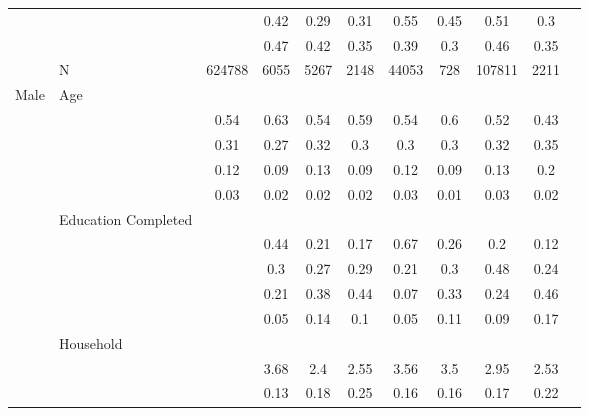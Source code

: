\documentclass[
]{article}
\begin{document}
\begin{landscape}
\begin{table}[ht]
\begin{tabular}{l>{\raggedright\arraybackslash}p{3.2cm}|ccccccccc}
   & \multicolumn{1}{>{\raggedleft\arraybackslash}p{2.9cm}|}{\makebox[2.9cm][r]{Lives with Child }} &  & 0.42 & 0.29 & 0.31 & 0.55 & 0.45 & 0.51 & 0.3 \\ 
   & \multicolumn{1}{>{\raggedleft\arraybackslash}p{3.4cm}|}{\makebox[3.4cm][r]{Married/Cohabiting }} &  & 0.47 & 0.42 & 0.35 & 0.39 & 0.3 & 0.46 & 0.35 \\ 
   & N & 624788 & 6055 & 5267 & 2148 & 44053 & 728 & 107811 & 2211 \\ 
  Male & Age &  &  &  &  &  &  &  &  \\ 
   & \multicolumn{1}{>{\raggedleft\arraybackslash}p{1.5cm}|}{\makebox[1.5cm][r]{60 - 69 }} & 0.54 & 0.63 & 0.54 & 0.59 & 0.54 & 0.6 & 0.52 & 0.43 \\ 
   & \multicolumn{1}{>{\raggedleft\arraybackslash}p{1.5cm}|}{\makebox[1.5cm][r]{70 - 79 }} & 0.31 & 0.27 & 0.32 & 0.3 & 0.3 & 0.3 & 0.32 & 0.35 \\ 
   & \multicolumn{1}{>{\raggedleft\arraybackslash}p{1.5cm}|}{\makebox[1.5cm][r]{80 - 89 }} & 0.12 & 0.09 & 0.13 & 0.09 & 0.12 & 0.09 & 0.13 & 0.2 \\ 
   & \multicolumn{1}{>{\raggedleft\arraybackslash}p{1.5cm}|}{\makebox[1.5cm][r]{90 plus }} & 0.03 & 0.02 & 0.02 & 0.02 & 0.03 & 0.01 & 0.03 & 0.02 \\ 
   & Education Completed &  &  &  &  &  &  &  &  \\ 
   & \multicolumn{1}{>{\raggedleft\arraybackslash}p{3.2cm}|}{\makebox[3.2cm][r]{Less than Primary }} &  & 0.44 & 0.21 & 0.17 & 0.67 & 0.26 & 0.2 & 0.12 \\ 
   & \multicolumn{1}{>{\raggedleft\arraybackslash}p{1.7cm}|}{\makebox[1.7cm][r]{Primary }} &  & 0.3 & 0.27 & 0.29 & 0.21 & 0.3 & 0.48 & 0.24 \\ 
   & \multicolumn{1}{>{\raggedleft\arraybackslash}p{2cm}|}{\makebox[2cm][r]{Secondary }} &  & 0.21 & 0.38 & 0.44 & 0.07 & 0.33 & 0.24 & 0.46 \\ 
   & \multicolumn{1}{>{\raggedleft\arraybackslash}p{2cm}|}{\makebox[2cm][r]{University }} &  & 0.05 & 0.14 & 0.1 & 0.05 & 0.11 & 0.09 & 0.17 \\ 
   & Household &  &  &  &  &  &  &  &  \\ 
   & \multicolumn{1}{>{\raggedleft\arraybackslash}p{2.7cm}|}{\makebox[2.7cm][r]{Household Size }} &  & 3.68 & 2.4 & 2.55 & 3.56 & 3.5 & 2.95 & 2.53 \\ 
   & \multicolumn{1}{>{\raggedleft\arraybackslash}p{2.2cm}|}{\makebox[2.2cm][r]{Lives Alone }} &  & 0.13 & 0.18 & 0.25 & 0.16 & 0.16 & 0.17 & 0.22 \\ 

\end{tabular}
\end{table}
\end{landscape}
\end{document}

